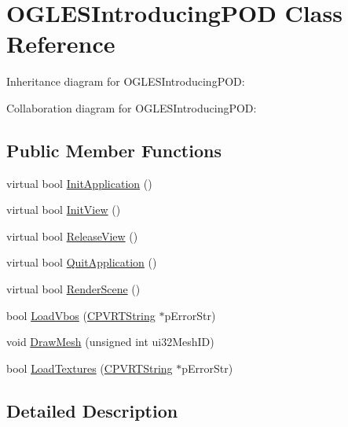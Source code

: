 \hypertarget{class_o_g_l_e_s_introducing_p_o_d}{\section{O\+G\+L\+E\+S\+Introducing\+P\+O\+D Class Reference}
\label{class_o_g_l_e_s_introducing_p_o_d}
}


Inheritance diagram for O\+G\+L\+E\+S\+Introducing\+P\+O\+D\+:


Collaboration diagram for O\+G\+L\+E\+S\+Introducing\+P\+O\+D\+:
\subsection*{Public Member Functions}
\begin{DoxyCompactItemize}
\item 
virtual bool \hyperlink{class_o_g_l_e_s_introducing_p_o_d_adce6b987c2b7627c53a4584a87a9d5e5}{Init\+Application} ()
\item 
virtual bool \hyperlink{class_o_g_l_e_s_introducing_p_o_d_aa56538d2f1d161c35d0072394ef99e6e}{Init\+View} ()
\item 
virtual bool \hyperlink{class_o_g_l_e_s_introducing_p_o_d_a25039dad935dc0c5ee4eaef865faefdb}{Release\+View} ()
\item 
virtual bool \hyperlink{class_o_g_l_e_s_introducing_p_o_d_a3d6c3b9133a02c4e1dc4dffbae96262b}{Quit\+Application} ()
\item 
virtual bool \hyperlink{class_o_g_l_e_s_introducing_p_o_d_a7eb8b367f70796cc16ca7579dc162c51}{Render\+Scene} ()
\item 
bool \hyperlink{class_o_g_l_e_s_introducing_p_o_d_ac59248522e053e6f83571b677fe6ff30}{Load\+Vbos} (\hyperlink{class_c_p_v_r_t_string}{C\+P\+V\+R\+T\+String} $\ast$p\+Error\+Str)
\item 
void \hyperlink{class_o_g_l_e_s_introducing_p_o_d_a7afef4ccb5807f12461f19167b713a9d}{Draw\+Mesh} (unsigned int ui32\+Mesh\+I\+D)
\item 
bool \hyperlink{class_o_g_l_e_s_introducing_p_o_d_a8f4409ae8856ab85c6bcafe8b4af7e00}{Load\+Textures} (\hyperlink{class_c_p_v_r_t_string}{C\+P\+V\+R\+T\+String} $\ast$p\+Error\+Str)
\end{DoxyCompactItemize}


\subsection{Detailed Description}


